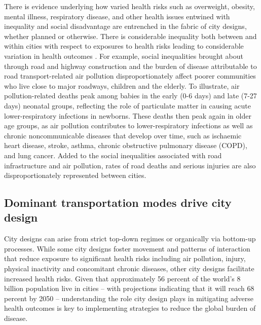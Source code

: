 \documentclass[preprint,10pt]{elsarticle} %
\begin{document}
There is evidence underlying how varied health risks such as overweight, obesity, mental illness, respiratory disease, and other health issues entwined with inequality and social disadvantage are entrenched in the fabric of city designs, whether planned or otherwise\cite{borrell2013factors,xing2016impact,yuchi2020road}. There is considerable inequality both between and within cities with respect to exposures to health risks leading to considerable variation in health outcomes \cite{KRISHNA2021102046}. For example, social inequalities brought about through road and highway construction\cite{carpenter2010poverty,archer2020white} and the burden of disease attributable to road transport-related air pollution disproportionately affect poorer communities who live close to major roadways, children and the elderly. To illustrate, air pollution-related deaths peak among babies in the early (0-6 days) and late (7-27 days) neonatal groups, reflecting the role of particulate matter in causing acute lower-respiratory infections in newborns. These deaths then peak again in older age groups, as air pollution contributes to lower-respiratory infections as well as chronic noncommunicable diseases that develop over time, such as ischaemic heart disease, stroke, asthma, chronic obstructive pulmonary disease (COPD), and lung cancer\cite{boogaard2022long}. Added to the social inequalities associated with road infrastructure and air pollution, rates of road deaths and serious injuries are also disproportionately represented between cities\cite{Thompson2020}.

\subsection*{Dominant transportation modes drive city design}
City designs can arise from strict top-down regimes\cite{mundigo1977city} or organically via bottom-up processes\cite{batty2017thinking, dovey2023atlas}. While some city designs foster movement and patterns of interaction that reduce exposure to significant health risks including air pollution, injury, physical inactivity and concomitant chronic diseases, other city designs facilitate increased health risks\cite{Wijnands2022, Stevenson2016,wang2023flood, stanley2022managing}. Given that approximately 56 percent of the world's 8 billion population live in cities -- with projections indicating that it will reach 68 percent by 2050\cite{WHO2023}  -- understanding the role city design plays in mitigating adverse health outcomes is key to implementing strategies to reduce the global burden of disease. 
\end{document}

